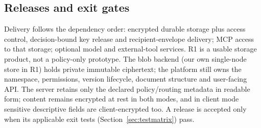\subsection{Releases and exit gates}\label{sec:releases}
Delivery follows the dependency order: encrypted durable storage plus access control, decision-bound key release and recipient-envelope delivery; MCP access to that storage; optional model and external-tool services. R1 is a usable storage product, not a policy-only prototype. The blob backend (our own single-node store in R1) holds private immutable ciphertext; the platform still owns the namespace, permissions, version lifecycle, document structure and user-facing API. The server retains only the declared policy/routing metadata in readable form; content remains encrypted at rest in both modes, and in client mode sensitive descriptive fields are client-encrypted too. A release is accepted only when its applicable exit tests (Section~\ref{sec:testmatrix}) pass.
